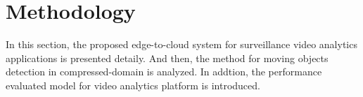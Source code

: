 

\chapter{Methodology}

In this section, the proposed edge-to-cloud system for surveillance video analytics applications is presented detaily. And then, the method for moving objects detection in compressed-domain is analyzed. In addtion, the performance evaluated model for video analytics platform is introduced. 

